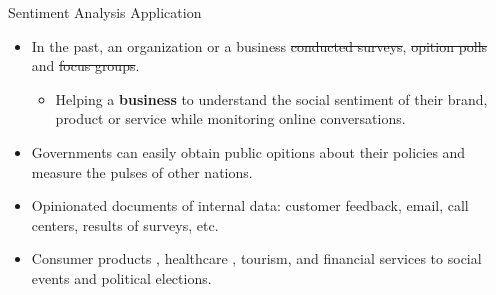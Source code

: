 \documentclass[xcolor=table]{beamer}
\begin{document}
\begin{frame}{Sentiment Analysis Application}
    \begin{itemize}
        \item In the past, an organization or a business \sout{conducted surveys}, \sout{opition polls} and \sout{focus groups}.
        \begin{itemize}
            \item Helping a \textbf{business} to understand the social sentiment of their brand, product or service while monitoring online conversations.
        \end{itemize}
        
        \pause
        \item Governments can easily obtain public opitions about their policies and measure the pulses of other nations.
        
        \pause
        \item Opinionated documents of internal data: customer feedback, email, call centers, results of surveys, etc.
        
        \pause
        \item Consumer products \cite{sadikov2009blogs}, healthcare \cite{khanhealthcare}, tourism, and financial services\cite{devitt2007sentiment} to social events and political elections\cite{o2010tweets}\cite{tumasjan2010predicting}.
        
    \end{itemize}
\end{frame}
\end{document}
